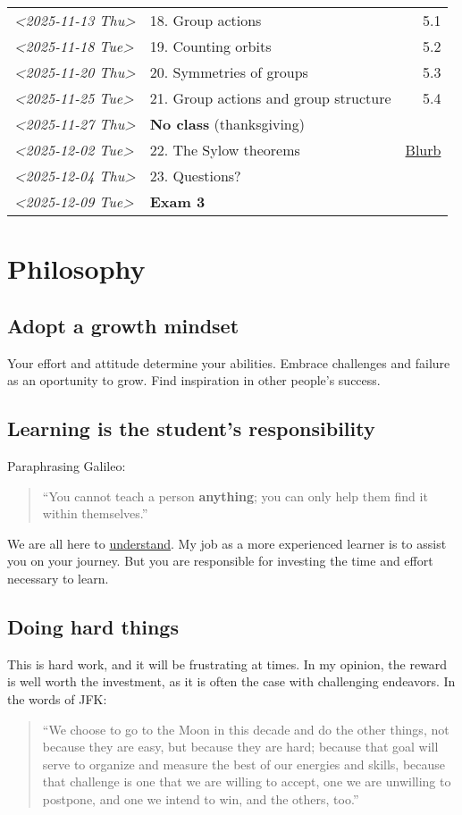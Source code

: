 \documentclass[11pt]{article}
\begin{document}
\begin{center}
\begin{tabular}{l|l|r}
\textit{<2025-11-13 Thu>} & 18. Group actions & 5.1\\[0pt]
\textit{<2025-11-18 Tue>} & 19. Counting orbits & 5.2\\[0pt]
\textit{<2025-11-20 Thu>} & 20. Symmetries of groups & 5.3\\[0pt]
\textit{<2025-11-25 Tue>} & 21. Group actions and group structure & 5.4\\[0pt]
\textit{<2025-11-27 Thu>} & \textbf{No class} (thanksgiving) & \\[0pt]
\textit{<2025-12-02 Tue>} & 22. The Sylow theorems & \href{https://kconrad.math.uconn.edu/blurbs/grouptheory/sylowpf.pdf}{Blurb}\\[0pt]
\textit{<2025-12-04 Thu>} & 23. Questions? & \\[0pt]
\textit{<2025-12-09 Tue>} & \textbf{Exam 3} & \\[0pt]
\hline
\end{tabular}
\end{center}

\section*{Philosophy}
\label{sec:org58e32e5}
\subsection*{Adopt a growth mindset}
\label{sec:orgfd2a254}
Your effort and attitude determine your abilities. Embrace challenges and
failure as an oportunity to grow. Find inspiration in other people's success.
\subsection*{Learning is the student's responsibility}
\label{sec:orga9c72ec}
Paraphrasing Galileo:
\begin{quote}
``You cannot teach a person \textbf{anything}; you can only help
them find it within themselves.''
\end{quote}
We are all here to \uline{understand}. My job as a more experienced learner is to
assist you on your journey. But you are responsible for investing the time and
effort necessary to learn.
\subsection*{Doing hard things}
\label{sec:orge351021}
This is hard work, and it will be frustrating at times. In my opinion, the
reward is well worth the investment, as it is often the case with challenging
endeavors. In the words of JFK:
\begin{quote}
``We choose to go to the Moon in this decade and do the other things, not
because they are easy, but because they are hard; because that goal will serve
to organize and measure the best of our energies and skills, because that
challenge is one that we are willing to accept, one we are unwilling to
postpone, and one we intend to win, and the others, too.''
\end{quote}
\end{document}

